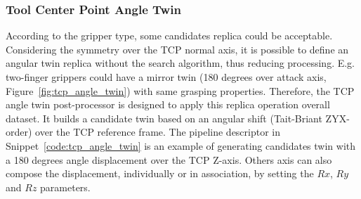 \subsubsection{Tool Center Point Angle Twin}
\label{cap4:modular_grasping_architecture:sec:grasping_synthesis:subsec:postprocessor:subsubsec:tcp_angle_twin}

According to the gripper type, some candidates replica could be acceptable. Considering the symmetry over the TCP normal axis, it is possible to define an angular twin replica without the search algorithm, thus reducing processing. E.g. two-finger grippers could have a mirror twin (180 degrees over attack axis, Figure~\ref{fig:tcp_angle_twin}) with same grasping properties. Therefore, the TCP angle twin post-processor is designed to apply this replica operation overall dataset. It builds a candidate twin based on an angular shift (Tait-Briant ZYX-order) over the TCP reference frame.  The pipeline descriptor in Snippet~\ref{code:tcp_angle_twin} is an example of generating candidates twin with a 180 degrees angle displacement over the TCP Z-axis. Others axis can also compose the displacement, individually or in association, by setting the $Rx$, $Ry$ and $Rz$ parameters.

\begin{figure}[h!]
\end{figure}

